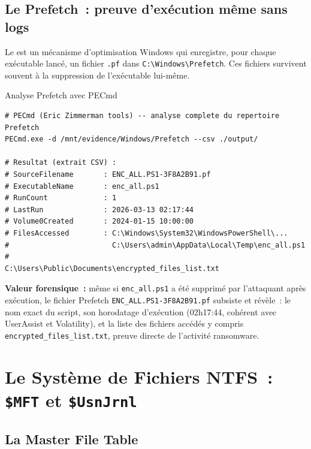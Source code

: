 \subsection{Le Prefetch~: preuve d'exécution même sans logs}

Le  est un mécanisme d'optimisation
Windows qui enregistre, pour chaque exécutable lancé, un fichier
\texttt{.pf} dans \texttt{C:\textbackslash Windows\textbackslash Prefetch}.
Ces fichiers survivent souvent à la suppression de l'exécutable lui-même.

\begin{boxoutils}{Analyse Prefetch avec PECmd}
\begin{lstlisting}[language=bash_forensique]
# PECmd (Eric Zimmerman tools) -- analyse complete du repertoire Prefetch
PECmd.exe -d /mnt/evidence/Windows/Prefetch --csv ./output/

# Resultat (extrait CSV) :
# SourceFilename       : ENC_ALL.PS1-3F8A2B91.pf
# ExecutableName       : enc_all.ps1
# RunCount             : 1
# LastRun              : 2026-03-13 02:17:44
# Volume0Created       : 2024-01-15 10:00:00
# FilesAccessed        : C:\Windows\System32\WindowsPowerShell\...
#                        C:\Users\admin\AppData\Local\Temp\enc_all.ps1
#                        C:\Users\Public\Documents\encrypted_files_list.txt
\end{lstlisting}
\textbf{Valeur forensique~:} même si \texttt{enc\_all.ps1} a été supprimé
par l'attaquant après exécution, le fichier Prefetch
\texttt{ENC\_ALL.PS1-3F8A2B91.pf} subsiste et révèle~: le nom exact du
script, son horodatage d'exécution (02h17:44, cohérent avec UserAssist
et Volatility), et la liste des fichiers accédés y compris
\texttt{encrypted\_files\_list.txt}, preuve directe de l'activité ransomware.
\end{boxoutils}

\section{Le Système de Fichiers NTFS~: \texttt{\$MFT} et \texttt{\$UsnJrnl}}
\label{sec:ntfs}

\subsection{La Master File Table}


